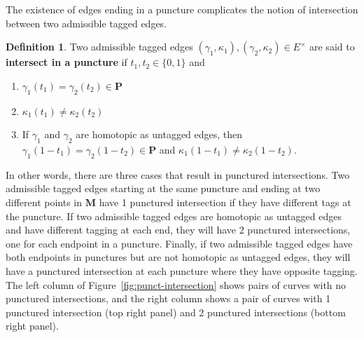 \documentclass[11pt]{amsart}
\theoremstyle{plain}
\theoremstyle{definition}
\newtheorem{definition}[theorem]{Definition}
\numberwithin{equation}{section}
\def\PP{\mathbf{P}}
\def\MM{\mathbf{M}}
\begin{document}
The existence of edges ending in a puncture complicates the notion of intersection between two admissible tagged edges.

\begin{definition}\label{def-puctintersection}
    Two admissible tagged edges $(\gamma_1,\kappa_1), (\gamma_2,\kappa_2) \in E^\times$ are said to \textbf{intersect in a puncture} if $t_1, t_2 \in \{0,1\}$ and 
    \begin{enumerate}
        \item $\gamma_1(t_1) = \gamma_2(t_2) \in \PP$
        \item $\kappa_1(t_1) \neq \kappa_2(t_2)$
        \item If $\gamma_1$ and $\gamma_2$ are homotopic as untagged edges, then $\gamma_1(1 - t_1) = \gamma_2(1 - t_2) \in \PP$ and $\kappa_1(1-t_1) \neq \kappa_2(1-t_2)$.
    \end{enumerate}
\end{definition}

In other words, there are three cases that result in punctured intersections.
Two admissible tagged edges starting at the same puncture and ending at two different points in $\MM$ have 1 punctured intersection if they have different tags at the puncture. 
If two admissible tagged edges are homotopic as untagged edges and have different tagging at each end, they will have 2 punctured intersections, one for each endpoint in a puncture.
Finally, if two admissible tagged edges have both endpoints in punctures but are not homotopic as untagged edges, they will have a punctured intersection at each puncture where they have opposite tagging.
The left column of Figure~\ref{fig:punct-intersection} shows pairs of curves with no punctured intersections, and the right column shows a pair of curves with 1 punctured intersection (top right panel) and 2 punctured intersections (bottom right panel).
\end{document}
